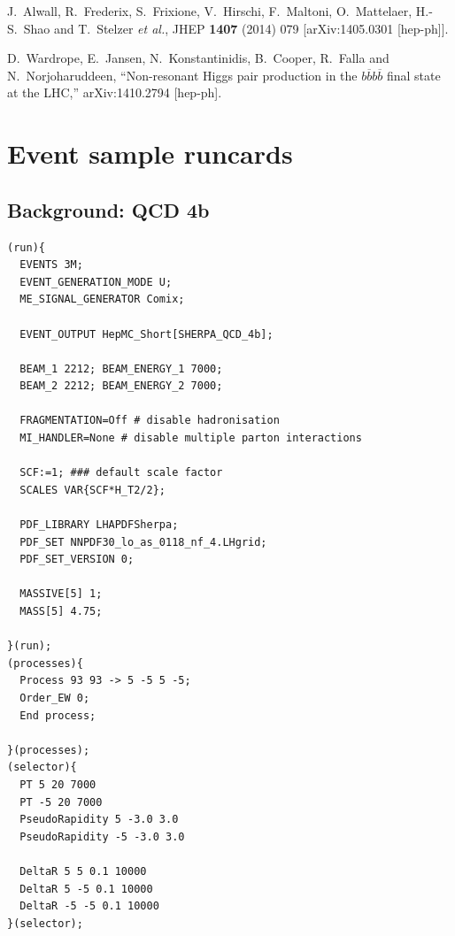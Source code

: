 \documentclass[12pt]{article}
\def\Acknowledgements{\bigskip  \bigskip \begin{center} \begin{large}
             \bf ACKNOWLEDGEMENTS \end{large}\end{center}}
\begin{document}


\begin{thebibliography}{1}

  J.~Alwall, R.~Frederix, S.~Frixione, V.~Hirschi, F.~Maltoni, O.~Mattelaer, H.-S.~Shao and T.~Stelzer {\it et al.},
  JHEP {\bf 1407} (2014) 079
  [arXiv:1405.0301 [hep-ph]].

  D.~Wardrope, E.~Jansen, N.~Konstantinidis, B.~Cooper, R.~Falla and N.~Norjoharuddeen,
  ``Non-resonant Higgs pair production in the $b\overline{b}b\overline{b}$ final state at the LHC,''
  arXiv:1410.2794 [hep-ph].


  \end{thebibliography}


\clearpage
\appendix
\section{Event sample runcards}
\label{app:runcards}
\subsection {Background: QCD 4b}
\begin{verbatim}
(run){
  EVENTS 3M;
  EVENT_GENERATION_MODE U;
  ME_SIGNAL_GENERATOR Comix;

  EVENT_OUTPUT HepMC_Short[SHERPA_QCD_4b];

  BEAM_1 2212; BEAM_ENERGY_1 7000;
  BEAM_2 2212; BEAM_ENERGY_2 7000;

  FRAGMENTATION=Off # disable hadronisation
  MI_HANDLER=None # disable multiple parton interactions

  SCF:=1; ### default scale factor
  SCALES VAR{SCF*H_T2/2};

  PDF_LIBRARY LHAPDFSherpa;
  PDF_SET NNPDF30_lo_as_0118_nf_4.LHgrid;
  PDF_SET_VERSION 0;

  MASSIVE[5] 1;
  MASS[5] 4.75;

}(run);
(processes){
  Process 93 93 -> 5 -5 5 -5;
  Order_EW 0;
  End process;

}(processes);
(selector){
  PT 5 20 7000
  PT -5 20 7000
  PseudoRapidity 5 -3.0 3.0
  PseudoRapidity -5 -3.0 3.0

  DeltaR 5 5 0.1 10000
  DeltaR 5 -5 0.1 10000
  DeltaR -5 -5 0.1 10000
}(selector);
\end{verbatim}
\end{document}
